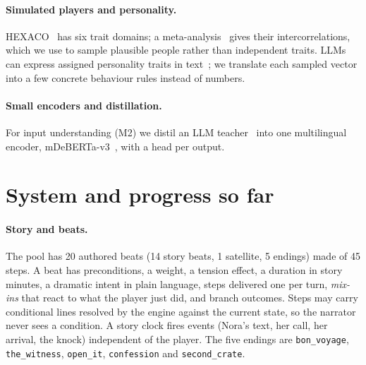 \documentclass{article}
\begin{document}
\paragraph{Simulated players and personality.}
HEXACO~\citep{ashton2007hexaco} has six trait domains; a meta-analysis~\citep{moshagen2019hexaco} gives their intercorrelations, which we use to sample plausible people rather than independent traits. LLMs can express assigned personality traits in text~\citep{jiang2024personallm}; we translate each sampled vector into a few concrete behaviour rules instead of numbers.

\paragraph{Small encoders and distillation.}
For input understanding (M2) we distil an LLM teacher~\citep{hinton2015distilling} into one multilingual encoder, mDeBERTa-v3~\citep{he2023debertav3}, with a head per output.

\section{System and progress so far}
\label{sec:system}

\paragraph{Story and beats.}
The pool has 20 authored beats (14 story beats, 1 satellite, 5 endings) made of 45 steps. A beat has preconditions, a weight, a tension effect, a duration in story minutes, a dramatic intent in plain language, steps delivered one per turn, \emph{mix-ins} that react to what the player just did, and branch outcomes. Steps may carry conditional lines resolved by the engine against the current state, so the narrator never sees a condition. A story clock fires events (Nora's text, her call, her arrival, the knock) independent of the player. The five endings are \texttt{bon\_voyage}, \texttt{the\_witness}, \texttt{open\_it}, \texttt{confession} and \texttt{second\_crate}.
\end{document}
